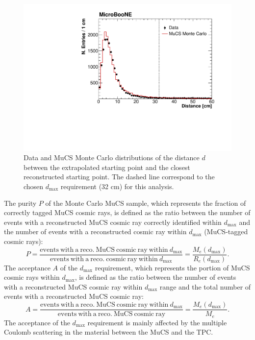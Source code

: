 \documentclass[a4paper,11pt]{article}
\begin{document}
\begin{figure}[htbp]
  \begin{center}
    \includegraphics[width=0.7\linewidth]{figures/dist.pdf}
    \caption{Data and MuCS Monte Carlo distributions of the distance $d$ between the extrapolated starting point and the closest reconstructed starting point. The dashed line correspond to the chosen $d_{\mathrm{max}}$ requirement (32 cm) for this analysis.} \label{fig:dist}
  \end{center}
\end{figure}



The purity $P$ of the Monte Carlo MuCS sample, which represents the fraction of correctly tagged MuCS cosmic rays, is defined as the ratio between the number of events with a reconstructed MuCS cosmic ray correctly identified within $d_{\mathrm{max}}$ and the number of events with a reconstructed cosmic ray within $d_{\mathrm{max}}$ (MuCS-tagged cosmic rays):
\begin{equation}
  P=\frac{\mathrm{events~with~a~reco.~MuCS~cosmic~ray~within~}d_{\mathrm{max}}}{\mathrm{events~with~a~reco.~cosmic~ray~within~}d_{\mathrm{max}}} = \frac{M_{e}(d_{\mathrm{max}})}{R_{e}(d_{\mathrm{max}})}.
\end{equation}
The acceptance $A$ of the $d_{\mathrm{max}}$ requirement, which represents the portion of MuCS cosmic rays within $d_{\mathrm{max}}$, is defined as the ratio between the number of events with a reconstructed MuCS cosmic ray within $d_{\mathrm{max}}$ range and the total number of events with a reconstructed MuCS cosmic ray:
\begin{equation}
  A=\frac{\mathrm{events~with~a~reco.~MuCS~cosmic~ray~within~}d_{\mathrm{max}}}{\mathrm{events~with~a~reco.~MuCS~cosmic~ray}} = \frac{M_{e}(d_{\mathrm{max}})}{M_{e}}.
\end{equation}
The acceptance of the $d_{\mathrm{max}}$ requirement is mainly affected by the multiple Coulomb scattering in the material between the MuCS and the TPC.
\end{document}
